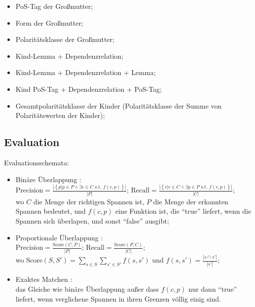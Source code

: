 \documentclass{beamer}
\begin{document}
\begin{frame}{\insertsubsection}
\begin{multicols}{2}
\begin{itemize}
\begin{itemize}
            \item PoS-Tag der Gro\ss{}mutter;
            \item Form der Gro\ss{}mutter;
            \item Polarit\"atsklasse der Gro\ss{}mutter;
            \item Kind-Lemma + Dependenzrelation;
            \item Kind-Lemma + Dependenzrelation + Lemma;
            \item Kind PoS-Tag + Dependenzrelation + PoS-Tag;
            \item Gesamtpolarit\"atsklasse der Kinder (Polarit\"atsklasse der
              Summe von Polarit\"atswerten der Kinder);
          \end{itemize}
        \end{itemize}
      \end{multicols}
    \end{frame}

    \subsection{Evaluation}
    \begin{frame}{\insertsubsection}
      Evaluationsschemata:
      \begin{itemize}
        \scriptsize
        \item Bin\"are \"Uberlappung \cite{Breck-07}:\\
          \begin{math}\textstyle
            \text{Precision} = \frac{|\left\{p| p \in P \wedge \exists
              c \in C \text{ s.t. } f(c,p)\right\}|}{|P|}\text{; }
            \text{Recall} = \frac{|\left\{c| c \in C \wedge \exists p
              \in P \text{ s.t. } f(c,p)\right\}|}{|C|};
          \end{math}\\
          wo $C$ die Menge der richtigen Spannen ist, $P$ die Menge der
          erkannten Spannen bedeutet, und $f(c, p)$ eine Funktion ist, die
          ``true'' liefert, wenn die Spannen sich \"uberlapen, und sonst
          ``false'' ausgibt;
        \item Proportionale \"Uberlappung \cite{Johansson-10}:\\
          \begin{math}\textstyle
            \text{Precision} = \frac{\text{Score}(C, P)}{|P|}\text{;
            }\text{Recall} = \frac{\text{Score}(P, C)}{|C|};
          \end{math}\\
          wo $\text{Score}(S, S') = \sum_{s \in S}\sum_{s' \in
            S'}f(s, s')$ und $f(s, s') = \frac{|s \cap s'|}{|s'|}$;
        \item Exaktes Matchen \cite{Breck-07}:\\ das Gleiche wie bin\"are
          \"Uberlappung au\ss{}er dass $f(c, p)$ nur dann ``true'' liefert,
          wenn verglichene Spannen in ihren Grenzen v\"ollig einig sind.
      \end{itemize}
    \end{frame}
\end{document}
